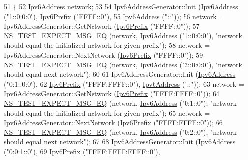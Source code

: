 \begin{DoxyCode}
51 \{
52   \hyperlink{classns3_1_1Ipv6Address}{Ipv6Address} network;
53 
54   Ipv6AddressGenerator::Init (\hyperlink{classns3_1_1Ipv6Address}{Ipv6Address} (\textcolor{stringliteral}{"1::0:0:0"}), \hyperlink{classns3_1_1Ipv6Prefix}{Ipv6Prefix} (\textcolor{stringliteral}{"FFFF::0"}),
55                               \hyperlink{classns3_1_1Ipv6Address}{Ipv6Address} (\textcolor{stringliteral}{"::"}));
56   network = Ipv6AddressGenerator::GetNetwork (\hyperlink{classns3_1_1Ipv6Prefix}{Ipv6Prefix} (\textcolor{stringliteral}{"FFFF::0"}));
57   \hyperlink{group__testing_ga7304ba46a28d8cf08dfdfd6499cf7068}{NS\_TEST\_EXPECT\_MSG\_EQ} (network, \hyperlink{classns3_1_1Ipv6Address}{Ipv6Address} (\textcolor{stringliteral}{"1::0:0:0"}), \textcolor{stringliteral}{"network should
       equal the initialized network for given prefix"});
58   network = Ipv6AddressGenerator::NextNetwork (\hyperlink{classns3_1_1Ipv6Prefix}{Ipv6Prefix} (\textcolor{stringliteral}{"FFFF::0"}));
59   \hyperlink{group__testing_ga7304ba46a28d8cf08dfdfd6499cf7068}{NS\_TEST\_EXPECT\_MSG\_EQ} (network, \hyperlink{classns3_1_1Ipv6Address}{Ipv6Address} (\textcolor{stringliteral}{"2::0:0:0"}), \textcolor{stringliteral}{"network should
       equal next network"});
60 
61   Ipv6AddressGenerator::Init (\hyperlink{classns3_1_1Ipv6Address}{Ipv6Address} (\textcolor{stringliteral}{"0:1::0:0"}),
62                               \hyperlink{classns3_1_1Ipv6Prefix}{Ipv6Prefix} (\textcolor{stringliteral}{"FFFF:FFFF::0"}), \hyperlink{classns3_1_1Ipv6Address}{Ipv6Address} (\textcolor{stringliteral}{"::"}));
63   network = Ipv6AddressGenerator::GetNetwork (\hyperlink{classns3_1_1Ipv6Prefix}{Ipv6Prefix} (\textcolor{stringliteral}{"FFFF:FFFF::0"}));
64   \hyperlink{group__testing_ga7304ba46a28d8cf08dfdfd6499cf7068}{NS\_TEST\_EXPECT\_MSG\_EQ} (network, \hyperlink{classns3_1_1Ipv6Address}{Ipv6Address} (\textcolor{stringliteral}{"0:1::0"}), \textcolor{stringliteral}{"network should
       equal the initialized network for given prefix"});
65   network = Ipv6AddressGenerator::NextNetwork (\hyperlink{classns3_1_1Ipv6Prefix}{Ipv6Prefix} (\textcolor{stringliteral}{"FFFF:FFFF::0"}));
66   \hyperlink{group__testing_ga7304ba46a28d8cf08dfdfd6499cf7068}{NS\_TEST\_EXPECT\_MSG\_EQ} (network, \hyperlink{classns3_1_1Ipv6Address}{Ipv6Address} (\textcolor{stringliteral}{"0:2::0"}), \textcolor{stringliteral}{"network should
       equal next network"});
67 
68   Ipv6AddressGenerator::Init (\hyperlink{classns3_1_1Ipv6Address}{Ipv6Address} (\textcolor{stringliteral}{"0:0:1::0"}),
69                               \hyperlink{classns3_1_1Ipv6Prefix}{Ipv6Prefix} (\textcolor{stringliteral}{"FFFF:FFFF:FFFF::0"}), 

\end{DoxyCode}
